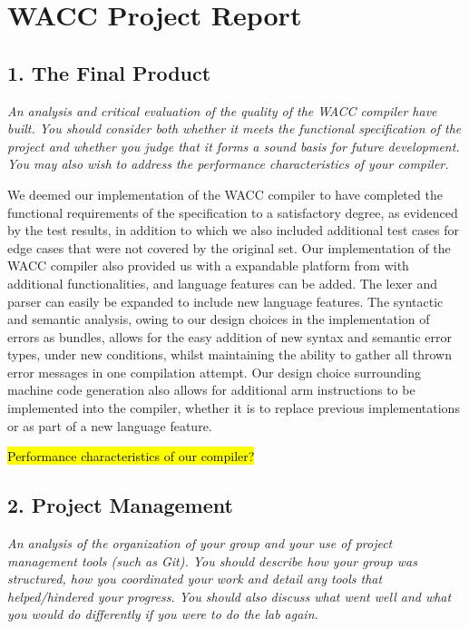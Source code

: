 \documentclass[10pt,a4paper]{report}
\begin{document}
  \section*{WACC Project Report}


  \subsection*{1. The Final Product}
  \textit{An analysis and critical evaluation of the quality of the WACC compiler
  have built. You should consider both whether it meets the functional
  specification of the project and whether you judge that it forms a sound basis
  for future development. You may also wish to address the performance
  characteristics of your compiler.}

  We deemed our implementation of the WACC compiler to have completed the
  functional requirements of the specification to a satisfactory degree, as
  evidenced by the test results, in addition to which we also included
  additional test cases for edge cases that were not covered by the original set.
  Our implementation of the WACC compiler also provided us with a expandable
  platform from with additional functionalities, and language features can be
  added. The lexer and parser can easily be expanded to include new language
  features. The syntactic and semantic analysis, owing to our design choices in
  the implementation of errors as bundles, allows for the easy addition of new
  syntax and semantic error types, under new conditions, whilst maintaining the
  ability to gather all thrown error messages in one compilation attempt.
  Our design choice surrounding machine code generation also allows for
  additional arm instructions to be implemented into the compiler, whether it is
  to replace previous implementations or as part of a new language feature.

  \hl{Performance characteristics of our compiler?}


  \subsection*{2. Project Management}
  \textit{An analysis of the organization of your group and your use of project
  management tools (such as Git). You should describe how your group was
  structured, how you coordinated your work and detail any tools that
  helped/hindered your progress. You should also discuss what went well and what
  you would do differently if you were to do the lab again.}
\end{document}
